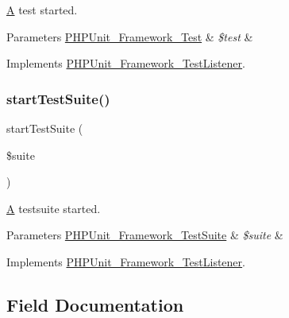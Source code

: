 \mbox{\hyperlink{class_a}{A}} test started.


\begin{DoxyParams}[1]{Parameters}
\mbox{\hyperlink{interface_p_h_p_unit___framework___test}{P\+H\+P\+Unit\+\_\+\+Framework\+\_\+\+Test}} & {\em \$test} & \\
\hline
\end{DoxyParams}


Implements \mbox{\hyperlink{interface_p_h_p_unit___framework___test_listener_a1a9bddc54f26bb3fb5c2ec9778ea5198}{P\+H\+P\+Unit\+\_\+\+Framework\+\_\+\+Test\+Listener}}.

\mbox{\label{class_p_h_p_unit___util___log___j_unit_a901a86a623d83184267b21f2daee0ff5}} 
\subsubsection{\texorpdfstring{start\+Test\+Suite()}{startTestSuite()}}
{\footnotesize\ttfamily start\+Test\+Suite (\begin{DoxyParamCaption}\item[{\mbox{\hyperlink{class_p_h_p_unit___framework___test_suite}{P\+H\+P\+Unit\+\_\+\+Framework\+\_\+\+Test\+Suite}}}]{\$suite }\end{DoxyParamCaption})}

\mbox{\hyperlink{class_a}{A}} testsuite started.


\begin{DoxyParams}[1]{Parameters}
\mbox{\hyperlink{class_p_h_p_unit___framework___test_suite}{P\+H\+P\+Unit\+\_\+\+Framework\+\_\+\+Test\+Suite}} & {\em \$suite} & \\
\hline
\end{DoxyParams}


Implements \mbox{\hyperlink{interface_p_h_p_unit___framework___test_listener_a901a86a623d83184267b21f2daee0ff5}{P\+H\+P\+Unit\+\_\+\+Framework\+\_\+\+Test\+Listener}}.



\subsection{Field Documentation}
\mbox{\label{class_p_h_p_unit___util___log___j_unit_a4f6d77e26718379b3fad41739753c5c4}} 

